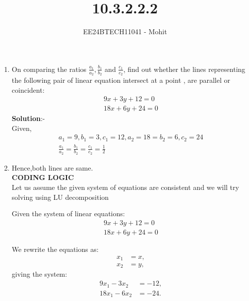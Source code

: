 \documentclass[journal]{IEEEtran}
\numberwithin{equation}{enumi}
\numberwithin{figure}{enumi}
\begin{document}

\title{10.3.2.2.2}
\author{EE24BTECH11041 - Mohit}
{\let\newpage\relax\maketitle}
\begin{enumerate}
\item On comparing the ratios $\frac{a_1}{a_2},\frac{b_1}{b_2}$ and $\frac{c_1}{c_2}$, find out whether the lines representing the following pair of linear equation intersect at a point , are parallel or coincident:\\
\begin{align}
9x + 3y + 12 = 0 \\
18x + 6y + 24 = 0
\end{align}
\textbf{Solution}:-\\
Given,
\begin{align}
a_1=9,b_1=3,c_1=12,a_2=18=b_2=6,c_2=24 \\
\frac{a_1}{a_2}=\frac{b_1}{b_2}=\frac{c_1}{c_2}=\frac{1}{2}
\end{align}
\item Hence,both lines are same.\\
\textbf{CODING LOGIC}\\


	Let us assume the given system of equations are consistent and we will try solving using LU decomposition
	
	Given the system of linear equations:
	\begin{align}
	9x + 3y + 12 = 0 \\
18x + 6y + 24 = 0
	\end{align}
	
	We rewrite the equations as:
	\begin{align}
		x_1 &= x, \\
		x_2 &= y,
	\end{align}
	giving the system:
	\begin{align}
		9x_1 - 3x_2 &= -12, \\
		18x_1 - 6x_2 &= -24.
	\end{align}
	

\end{enumerate}
\end{document}
